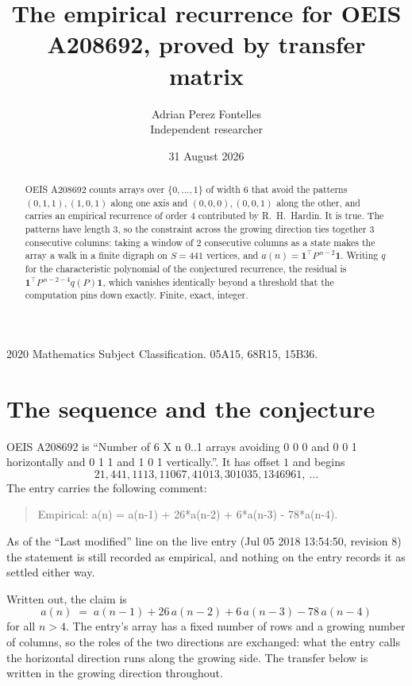 \documentclass[11pt,a4paper]{article}
\title{The empirical recurrence for OEIS A208692, proved by transfer matrix}
\author{Adrian Perez Fontelles\\ \small Independent researcher}
\date{31 August 2026}
\theoremstyle{plain}
\theoremstyle{definition}
\begin{document}
\maketitle

\begin{abstract}
OEIS A208692 counts arrays over $\{0,\dots,1\}$ of width $6$ that avoid the patterns
$(0,1,1), (1,0,1)$ along one axis and $(0,0,0), (0,0,1)$ along the other, and carries an empirical recurrence of
order $4$ contributed by R.~H.~Hardin. It is true. The patterns have length $3$, so
the constraint across the growing direction ties together $3$ consecutive columns: taking a
window of $2$ consecutive columns as a state makes the array a walk in a finite digraph
on $S=441$ vertices, and $a(n)=\mathbf{1}^{\!\top}P^{\,n-2}\mathbf{1}$. Writing $q$
for the characteristic polynomial of the conjectured recurrence, the residual is
$\mathbf{1}^{\!\top}P^{\,n-2-4}q(P)\mathbf{1}$, which vanishes identically
beyond a threshold that the computation pins down exactly. Finite, exact, integer.
\end{abstract}

\noindent\small 2020 Mathematics Subject Classification. 05A15, 68R15, 15B36.\normalsize

\section{The sequence and the conjecture}

OEIS A208692 is ``Number of 6 X n 0..1 arrays avoiding 0 0 0 and 0 0 1 horizontally and 0 1 1 and 1 0 1 vertically.''. It has offset
$1$ and begins
\[
21, 441, 1113, 11067, 41013, 301035, 1346961,\ \dots
\]
The entry carries the following comment:
\begin{quote}\small
Empirical: a(n) = a(n-1) + 26*a(n-2) + 6*a(n-3) - 78*a(n-4).
\end{quote}
As of the ``Last modified'' line on the live entry (Jul 05 2018 13:54:50, revision
8) the statement is still recorded as empirical, and nothing on the entry
records it as settled either way.

Written out, the claim is
\begin{equation}\label{eq:conj}
a(n)\;=\;a(n-1) + 26\,a(n-2) + 6\,a(n-3) - 78\,a(n-4)
\end{equation}
for all $n>4$. The entry's array has a fixed number of rows and a growing number of
columns, so the roles of the two directions are exchanged: what the entry calls the
horizontal direction runs along the growing side. The transfer below is written in the
growing direction throughout.
\end{document}
